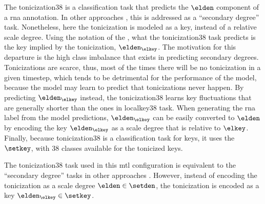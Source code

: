

The \gls{tonicization38} is a classification task that
predicts the $\elden$ component of a \gls{rna} annotation.
In other approaches
\parencite{chen2021attend,micchi2021deep}, this is addressed
as a ``secondary degree'' task. Nonetheless, here the
tonicization is modeled as a key, instead of a relative
scale degree. Using the notation of the
, what
the \gls{tonicization38} task predicts is the key implied by
the tonicization, $\elden_{\elkey}$. The motivation for this
departure is the high class imbalance that exists in
predicting secondary degrees. Tonicizations are scarce,
thus, most of the times there will be no tonicization in a
given timestep, which tends to be detrimental for the
performance of the model, because the model may learn to
predict that tonicizations never happen. By predicting
$\elden_{\elkey}$ instead, the \gls{tonicization38} learns
key fluctuations that are generally shorter than the ones in
\gls{localkey38} task. When generating the \gls{rna} label
from the model predictions, $\elden_{\elkey}$ can be easily
converted to $\elden$ by encoding the key $\elden_{\elkey}$
as a scale degree that is relative to $\elkey$. Finally,
because \gls{tonicization38} is a classification task for
keys, it uses the $\setkey$, with 38 classes available for
the tonicized keys.

The \gls{tonicization38} task used in this \gls{mtl}
configuration is equivalent to the ``secondary degree''
tasks in other approaches
\parencite{chen2021attend,micchi2021deep}. However, instead
of encoding the tonicization as a scale degree $\elden \in
\setden$, the tonicization is encoded as a key
$\elden_\elkey \in \setkey$. 

